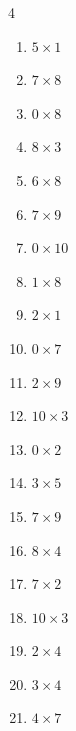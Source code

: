 \begin{multicols}{4}
\begin{enumerate}
  \item $5\times 1$
        \phantom{$=5$}

  \item $7\times 8$
        \phantom{$=56$}

  \item $0\times 8$
        \phantom{$=0$}

  \item $8\times 3$
        \phantom{$=24$}

  \item $6\times 8$
        \phantom{$=48$}

  \item $7\times 9$
        \phantom{$=63$}

  \item $0\times 10$
        \phantom{$=0$}

  \item $1\times 8$
        \phantom{$=8$}

  \item $2\times 1$
        \phantom{$=2$}

  \item $0\times 7$
        \phantom{$=0$}

  \item $2\times 9$
        \phantom{$=18$}

  \item $10\times 3$
        \phantom{$=30$}

  \item $0\times 2$
        \phantom{$=0$}

  \item $3\times 5$
        \phantom{$=15$}

  \item $7\times 9$
        \phantom{$=63$}

  \item $8\times 4$
        \phantom{$=32$}

  \item $7\times 2$
        \phantom{$=14$}

  \item $10\times 3$
        \phantom{$=30$}

\columnbreak %

  \item $2\times 4$
        \phantom{$=8$}

  \item $3\times 4$
        \phantom{$=12$}

  \item $4\times 7$
        \phantom{$=28$}


\end{enumerate}
\end{multicols}
